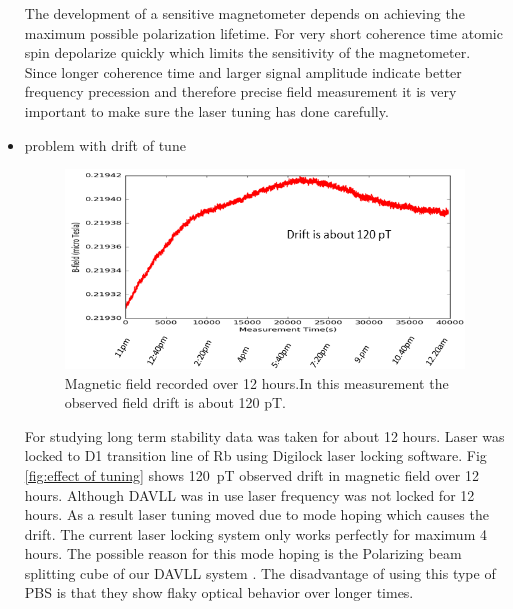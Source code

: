 \begin{itemize}
The development of a sensitive magnetometer depends on achieving the maximum possible polarization lifetime.  For very short coherence time atomic spin depolarize quickly which limits the sensitivity of the magnetometer.
Since  longer coherence time and larger signal amplitude indicate better frequency precession and therefore precise field measurement it is very important to make sure the laser tuning has done carefully.
  
   \item problem with drift of tune
      \begin{figure}[h]
\centering\includegraphics[width=0.6\linewidth]{figures/field_drift}
\caption{Magnetic field recorded over 12 hours.In this measurement the observed field drift is about 120 pT.\label{digilock field drift}}
\end{figure}
   For studying long term stability data was taken for about 12 hours. Laser was locked to D1 transition line of Rb using Digilock laser locking software. Fig \ref{fig:effect of tuning} shows 120~pT observed drift in magnetic field over 12 hours. Although DAVLL was in use laser frequency was not locked for 12 hours. As a result laser tuning moved due to mode hoping which causes the drift. The current laser locking system only works perfectly for maximum 4 hours. The possible reason for this mode hoping is the Polarizing beam splitting cube of our DAVLL system \cite{principles}. The disadvantage of using this type of PBS is that they show flaky optical behavior over longer times.


\end{itemize}
